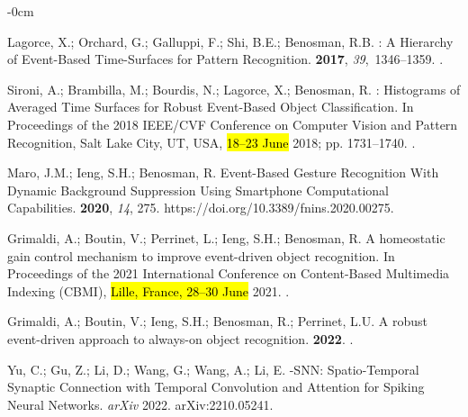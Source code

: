 \documentclass[brainsci, %
               review,accept,pdftex,moreauthors
               ]{Definitions/mdpi}
\begin{document}
\begin{adjustwidth}{-\extralength}{0cm}
\begin{thebibliography}{999}
Lagorce, X.; Orchard, G.; Galluppi, F.; Shi, B.E.; Benosman, R.B.
: {A} {Hierarchy} of {Event}-{Based} {Time}-{Surfaces} for
  {Pattern} {Recognition}.
  {\bf 2017}, {\em 39},~1346--1359.
.

Sironi, A.; Brambilla, M.; Bourdis, N.; Lagorce, X.; Benosman, R.
: {Histograms} of {Averaged} {Time} {Surfaces} for {Robust}
  {Event}-{Based} {Object} {Classification}.
\newblock In Proceedings of the 2018 {IEEE}/{CVF} {Conference} on {Computer}
  {Vision} and {Pattern} {Recognition}, Salt Lake City, UT, USA, \hl{18--23 June} %
  2018;
  pp. 1731--1740.
.

Maro, J.M.; Ieng, S.H.; Benosman, R.
\newblock Event-{Based} {Gesture} {Recognition} {With} {Dynamic} {Background}
  {Suppression} {Using} {Smartphone} {Computational} {Capabilities}.
 {\bf 2020}, {\em 14}, 275.
  {{https://doi.org/10.3389/fnins.2020.00275}}.

Grimaldi, A.; Boutin, V.; Perrinet, L.; Ieng, S.H.; Benosman, R.
\newblock A homeostatic gain control mechanism to improve event-driven object
  recognition.
\newblock In Proceedings of the 2021 {International} {Conference} on
  {Content}-{Based} {Multimedia} {Indexing} ({CBMI}),  \hl{Lille, France,  28--30 June} %
  2021.
.

Grimaldi, A.; Boutin, V.; Ieng, S.H.; Benosman, R.; Perrinet, L.U.
\newblock A robust event-driven approach to always-on object recognition.
 {\bf 2022}.
.

Yu, C.; Gu, Z.; Li, D.; Wang, G.; Wang, A.; Li, E.
-{SNN}: {Spatio}-{Temporal} {Synaptic} {Connection} with
  {Temporal} {Convolution} and {Attention} for {Spiking} {Neural} {Networks}.  	\emph{arXiv}
  2022.
\newblock arXiv:2210.05241.


\end{thebibliography}
\end{adjustwidth}
\end{document}
